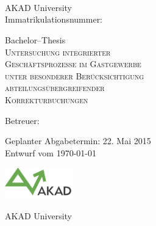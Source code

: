 

\begin{titlepage}


\vspace{5cm}

\Name \\ 
\Strasse \\ 
\PlzOrt\\ 
\href{mailto:\Email}{\Email}

AKAD University\\
Immatrikulationsnummer: \Immatrikulationsnummer

\vfill

Bachelor--Thesis\\
\LARGE
\textsc{Untersuchung integrierter\\
Geschäftsprozesse im Gastgewerbe\\
unter besonderer Berücksichtigung \\
abteilungsübergreifender\\
Korrekturbuchungen}

\vfill

\normalsize

Betreuer: \Betreuer

Geplanter Abgabetermin: 22. Mai 2015\\
Entwurf vom \today %


\vfill

\includegraphics[width=3cm]{akad_logo.png}  

AKAD University 

\end{titlepage}



\normalsize

